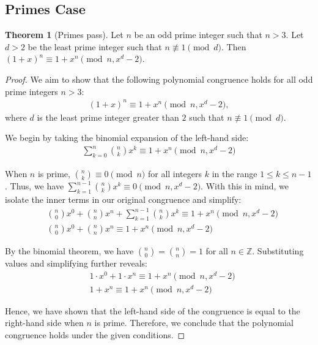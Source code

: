 \documentclass{article}
\theoremstyle{plain}
\theoremstyle{definition}
\newtheorem{theorem}{Theorem}
\begin{document}
\subsection{Primes Case}
\begin{theorem}[Primes pass] \label{theorem:primes}
Let $n$ be an odd prime integer such that $n > 3$. Let $d > 2$ be the least prime integer such that $n \not\equiv 1 \pmod{d}$. Then $(1 + x)^n \equiv 1 + x^n \pmod{n, x^d - 2}$.
\end{theorem}
\begin{proof}
We aim to show that the following polynomial congruence holds for all odd prime integers $n > 3$:
\begin{align}
    (1 + x)^n \equiv 1 + x^n \pmod{n, x^d - 2},
\end{align}
where $d$ is the least prime integer greater than $2$ such that $n \not\equiv 1 \pmod{d}$.

We begin by taking the binomial expansion of the left-hand side:
\begin{align}
    \sum_{k=0}^{n} \binom{n}{k} x^k \equiv 1 + x^n \pmod{n, x^d - 2}
\end{align}

When $n$ is prime, $\binom{n}{k} \equiv 0 \pmod{n}$ for all integers $k$ in the range $1 \leq k \leq n-1$. Thus, we have $\sum_{k=1}^{n-1} \binom{n}{k} x^k \equiv 0 \pmod{n, x^d - 2}$. With this in mind, we isolate the inner terms in our original congruence and simplify:
\begin{align}
    & \binom{n}{0} x^0 + \binom{n}{n} x^n + \sum_{k=1}^{n-1} \binom{n}{k} x^k \equiv 1 + x^n \pmod{n, x^d - 2} \\
    & \binom{n}{0} x^0 + \binom{n}{n} x^n \equiv 1 + x^n \pmod{n, x^d - 2}
\end{align}

By the binomial theorem, we have $\binom{n}{0} = \binom{n}{n} = 1$ for all $n \in \mathbb{Z}$. Substituting values and simplifying further reveals:
\begin{align}
    & 1 \cdot x^0 + 1 \cdot x^n \equiv 1 + x^n \pmod{n, x^d - 2} \\
    & 1 + x^n \equiv 1 + x^n \pmod{n, x^d - 2}
\end{align}

Hence, we have shown that the left-hand side of the congruence is equal to the right-hand side when $n$ is prime. Therefore, we conclude that the polynomial congruence holds under the given conditions.
\end{proof}
\end{document}
